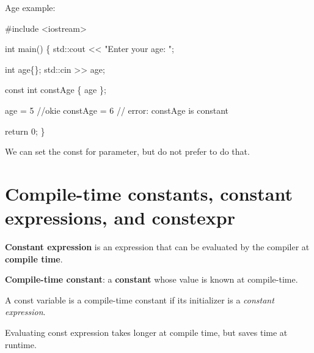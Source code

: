\documentclass[
  letterpaper,
  DIV=11,
  numbers=noendperiod]{scrreprt}
\newenvironment{Shaded}{\begin{snugshade}}{\end{snugshade}}
\newcommand{\CommentTok}[1]{\textcolor[rgb]{0.37,0.37,0.37}{#1}}
\newcommand{\DecValTok}[1]{\textcolor[rgb]{0.68,0.00,0.00}{#1}}
\newcommand{\ErrorTok}[1]{\textcolor[rgb]{0.68,0.00,0.00}{#1}}
\newcommand{\FunctionTok}[1]{\textcolor[rgb]{0.28,0.35,0.67}{#1}}
\newcommand{\NormalTok}[1]{\textcolor[rgb]{0.00,0.23,0.31}{#1}}
\newcommand{\OtherTok}[1]{\textcolor[rgb]{0.00,0.23,0.31}{#1}}
\newcommand{\SpecialCharTok}[1]{\textcolor[rgb]{0.37,0.37,0.37}{#1}}
\newcommand{\StringTok}[1]{\textcolor[rgb]{0.13,0.47,0.30}{#1}}
\begin{document}
Age example:

\begin{Shaded}
\begin{Highlighting}[]
\CommentTok{\#include \textless{}iostream\textgreater{}}

\NormalTok{int }\FunctionTok{main}\NormalTok{() }
\NormalTok{\{}
\NormalTok{  std}\SpecialCharTok{::}\NormalTok{cout }\SpecialCharTok{\textless{}}\ErrorTok{\textless{}} \StringTok{"Enter your age: "}\NormalTok{;}
  
\NormalTok{  int age\{\};}
\NormalTok{  std}\SpecialCharTok{::}\NormalTok{cin }\SpecialCharTok{\textgreater{}}\ErrorTok{\textgreater{}}\NormalTok{ age;}
  
\NormalTok{  const int constAge \{ age \};}
  
\NormalTok{  age }\OtherTok{=} \DecValTok{5}         \SpecialCharTok{/}\ErrorTok{/}\NormalTok{okie}
\NormalTok{  constAge }\OtherTok{=} \DecValTok{6}    \SpecialCharTok{/}\ErrorTok{/}\NormalTok{ error}\SpecialCharTok{:}\NormalTok{ constAge is constant}
  
\NormalTok{  return }\DecValTok{0}\NormalTok{;}
\NormalTok{\}}
\end{Highlighting}
\end{Shaded}

We can set the const for parameter, but do not prefer to do that.

\hypertarget{compile-time-constants-constant-expressions-and-constexpr}{%
\section{Compile-time constants, constant expressions, and
constexpr}\label{compile-time-constants-constant-expressions-and-constexpr}}

\textbf{Constant expression} is an expression that can be evaluated by
the compiler at \textbf{compile time}.

\textbf{Compile-time constant}: a \textbf{constant} whose value is known
at compile-time.

\begin{tcolorbox}[enhanced jigsaw, toprule=.15mm, rightrule=.15mm, opacityback=0, breakable, leftrule=.75mm, colback=white, colframe=quarto-callout-note-color-frame, arc=.35mm, left=2mm, bottomrule=.15mm]
\begin{minipage}[t]{5.5mm}
\textcolor{quarto-callout-note-color}{\faInfo}
\end{minipage}%
\begin{minipage}[t]{\textwidth - 5.5mm}

A const variable is a compile-time constant if its initializer is a
\emph{constant expression}.

Evaluating const expression takes longer at compile time, but saves time
at runtime.

\end{minipage}%
\end{tcolorbox}
\end{document}
